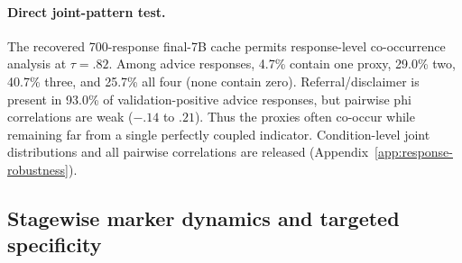 \documentclass[11pt]{article}
\begin{document}
\begin{table}[t]
\centering
\small
\setlength{\tabcolsep}{2pt}
\caption{Advice minus each axis-targeted control (prompt-clustered permutation $p$,
10k draws). Benjamini--Hochberg correction across the 24 displayed tests leaves
the validation-phrase result unchanged (all $q\leq.0082$). Non-significant
cells mean ``no detected difference,'' not equivalence.}
\label{tab:contrasts}
\end{table}

\paragraph{Direct joint-pattern test.}
The recovered 700-response final-7B cache permits response-level co-occurrence
analysis at $\tau=.82$. Among advice responses, 4.7\% contain one proxy, 29.0\%
two, 40.7\% three, and 25.7\% all four (none contain zero). Referral/disclaimer
is present in 93.0\% of validation-positive advice responses, but pairwise phi
correlations are weak ($-.14$ to $.21$). Thus the proxies often co-occur while
remaining far from a single perfectly coupled indicator. Condition-level joint
distributions and all pairwise correlations are released
(Appendix~\ref{app:response-robustness}).

\subsection{Stagewise marker dynamics and targeted specificity}
\label{sec:stagewise}
\end{document}
